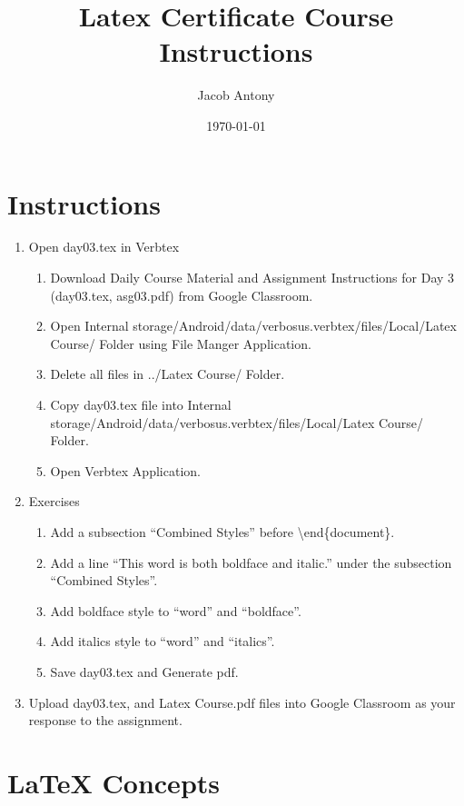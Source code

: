 \documentclass{article}
\title{Latex Certificate Course Instructions}
\author{Jacob Antony}
\date{\today}
\begin{document}
\maketitle

\section*{Instructions}

\begin{enumerate}
	\item Open day03.tex in Verbtex
	\begin{enumerate}
		\item Download Daily Course Material and Assignment Instructions for Day 3 (day03.tex, asg03.pdf) from Google Classroom.
		\item Open Internal storage/Android/data/verbosus.verbtex/files/Local/Latex Course/ Folder using File Manger Application.
		\item Delete all files in ../Latex Course/ Folder.
		\item Copy day03.tex file into Internal storage/Android/data/verbosus.verbtex/files/Local/Latex Course/  Folder.
		\item Open Verbtex Application.
	\end{enumerate}
	\item Exercises
	\begin{enumerate}
		\item Add a subsection ``Combined Styles'' before \textbackslash{}end\{document\}.
		\item Add a line ``This word is both boldface and italic.'' under the subsection ``Combined Styles''.
		\item Add boldface style to ``word'' and ``boldface''.
		\item Add italics style to ``word'' and ``italics''.
		\item Save day03.tex and Generate pdf.
	\end{enumerate}
	\item Upload day03.tex, and Latex Course.pdf files into Google Classroom as your response to the assignment.
\end{enumerate}

\section{\LaTeX{} Concepts}
\end{document}
